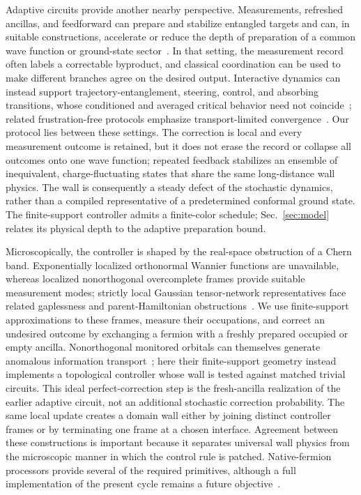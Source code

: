 \documentclass[aps,prx,twocolumn,superscriptaddress,longbibliography,nofootinbib,floatfix]{revtex4-2}
\begin{document}
Adaptive circuits provide another nearby perspective.  Measurements, refreshed ancillas, and feedforward can prepare and stabilize entangled targets and can, in suitable constructions, accelerate or reduce the depth of preparation of a common wave function or ground-state sector~\cite{LuLessaKimHsieh2022,Roy2020,Puente2024,Smith2024}.  In that setting, the measurement record often labels a correctable byproduct, and classical coordination can be used to make different branches agree on the desired output.  Interactive dynamics can instead support trajectory-entanglement, steering, control, and absorbing transitions, whose conditioned and averaged critical behavior need not coincide~\cite{RavindranathHanYang2023,ODeaMorningstarGopalakrishnan2024,PiroliLiVasseur2023}; related frustration-free protocols emphasize transport-limited convergence~\cite{Doerstel2026}.  Our protocol lies between these settings.  The correction is local and every measurement outcome is retained, but it does not erase the record or collapse all outcomes onto one wave function; repeated feedback stabilizes an ensemble of inequivalent, charge-fluctuating states that share the same long-distance wall physics.  The wall is consequently a steady defect of the stochastic dynamics, rather than a compiled representative of a predetermined conformal ground state.  The finite-support controller admits a finite-color schedule; Sec.~\ref{sec:model} relates its physical depth to the adaptive preparation bound.

Microscopically, the controller is shaped by the real-space obstruction of a Chern band.  Exponentially localized orthonormal Wannier functions are unavailable, whereas localized nonorthogonal overcomplete frames provide suitable measurement modes; strictly local Gaussian tensor-network representatives face related gaplessness and parent-Hamiltonian obstructions~\cite{Brouder2007,DubailRead2015,LiDongLedwithKhalaf2024}.  We use finite-support approximations to these frames, measure their occupations, and correct an undesired outcome by exchanging a fermion with a freshly prepared occupied or empty ancilla.  Nonorthogonal monitored orbitals can themselves generate anomalous information transport~\cite{PoboikoSzyniszewskiTurner2025}; here their finite-support geometry instead implements a topological controller whose wall is tested against matched trivial circuits.  This ideal perfect-correction step is the fresh-ancilla realization of the earlier adaptive circuit, not an additional stochastic correction probability.  The same local update creates a domain wall either by joining distinct controller frames or by terminating one frame at a chosen interface.  Agreement between these constructions is important because it separates universal wall physics from the microscopic manner in which the control rule is patched.  Native-fermion processors provide several of the required primitives, although a full implementation of the present cycle remains a future objective~\cite{GonzalezCuadraBluvsteinKalinowski2023}.
\end{document}

